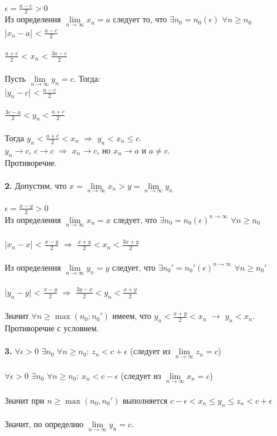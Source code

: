 \documentclass{article}
\DeclareMathOperator{\Exists}{\exists}
\DeclareMathOperator{\Forall}{\forall}
\begin{document}
   $\epsilon = \frac{a - c}{2} > 0$ \\
   Из определения $\lim\limits_{n \to \infty} {x_n} = a$ следует то, что $\Exists n_0 = n_0(\epsilon)$ $\Forall n \geq n_0$ \\
   |$x_n - a$| < $\frac{a - c}{2}$ \\
   \\
   $\frac{a + c}{2}$ < $x_n$ < $\frac{3a - c}{2}$ \\
   \\
   Пусть $\lim\limits_{n \to \infty} {y_n} = c$. Тогда: \\
   |$y_n - c$| < $\frac{a - c}{2}$ \\
   \\
   $\frac{3c - a}{2} < y_n < \frac{a + c}{2}$\\
   \\
   Тогда $y_n < \frac{a + c}{2} < x_n$ $\Rightarrow$ $y_n < x_n \leq c$. \\
   $y_n \to c$, $c \to c$ $\Rightarrow$ $x_n \to c$, но $x_n \to a$ и $a \neq c$.\\
   Противоречие.\\
   \\
   \textbf{2.} Допустим, что $x = \lim\limits_{n \to \infty} {x_n} > y = \lim\limits_{n \to \infty} {y_n}$ \\
   \\
   $\epsilon = \frac{x - y}{2} > 0$
   \\
   Из определения $\lim\limits_{n \to \infty} {x_n} = x$ следует, что $\Exists n_0 = n_0(\epsilon)^{n \to \infty}$ $\Forall n \geq n_0$\\
   \\
   |$x_n - x$| < $\frac{x - y}{2}$ $\Rightarrow$ $\frac{x + y}{2} < x_n < \frac{3x + y}{2}$ \\
   \\
   Из определения $\lim\limits_{n \to \infty} {y_n} = y$ следует, что $\Exists n_0' = n_0'(\epsilon)^{n \to \infty}$ $\Forall n \geq n_0'$\\
   \\
   |$y_n - y$| < $\frac{x - y}{2}$ $\Rightarrow$ $\frac{3y - x}{2} < y_n < \frac{x + y}{2}$ \\
   \\
   Значит $\Forall n \geq \max(n_0; n_0')$ имеем, что $y_n < \frac{x + y}{2} < x_n$ $\rightarrow$ $y_n < x_n$. \\
   Противоречие с условием.\\
   \\
   \textbf{3.} $\Forall \epsilon > 0$ $\Exists n_0$ $\Forall n \geq n_0$: $z_n < c + \epsilon$ (следует из $\lim\limits_{n \to \infty} {z_n} = c$) \\
   \\
   $\Forall \epsilon > 0$ $\Exists n_0$ $\Forall n \geq n_0$: $x_n < c - \epsilon$ (следует из $\lim\limits_{n \to \infty} {x_n} = c$) \\
   \\
   Значит при $n \geq \max(n_0, n_0')$ выполняется $c - \epsilon < x_n \leq y_n \leq z_n < c + \epsilon$ \\
   \\
   Значит, по определию  $\lim\limits_{n \to \infty} {y_n} = c$.
    \\
   
\end{document}
